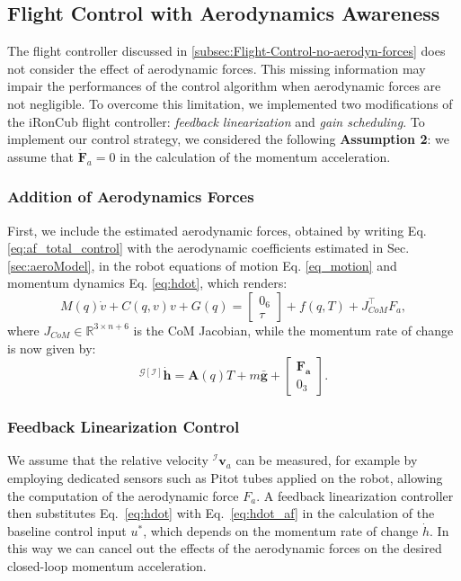 \subsection{Flight Control with Aerodynamics Awareness}

The flight controller discussed in \ref{subsec:Flight-Control-no-aerodyn-forces} does not consider the effect of aerodynamic forces. This missing information may impair the performances of the control algorithm when aerodynamic forces are not negligible. To overcome this limitation, we implemented two modifications of the iRonCub flight controller: \emph{feedback linearization} and \emph{gain scheduling}.
To implement our control strategy, we considered the following \textbf{Assumption 2}: we assume that $\dot{\boldsymbol{F}}_a = 0$ in the calculation of the momentum acceleration.

\subsubsection*{Addition of Aerodynamics Forces}
First, we include the estimated aerodynamic forces, obtained by writing Eq. \eqref{eq:af_total_control} with the aerodynamic coefficients estimated in Sec. \ref{sec:aeroModel}, in the robot equations of motion Eq. \eqref{eq_motion} and momentum dynamics Eq. \eqref{eq:hdot}, which renders:
\begin{equation}
\label{eq_motion_af}
  M(q)\dot{v}+C(q,v)v+G(q)=
  \begin{bmatrix}
    0_6\\
    \tau
  \end{bmatrix}
  +f(q,T)+J_{CoM}^{\top}F_a,
\end{equation}
where $J_{CoM} \in \mathbb{R}^{3 \times n+6}$ is the CoM Jacobian, while the momentum rate of change is now given by:
\begin{equation}
\label{eq:hdot_af}
   {}^{\mathcal{G}[\mathcal{I}]}\dot{\boldsymbol{h}}=\boldsymbol{A}(q)T+m\bar{\boldsymbol{g}}+
   \begin{bmatrix}
   \boldsymbol{F_a}\\
   0_3
   \end{bmatrix}.
\end{equation}

\subsubsection*{Feedback Linearization Control}

We assume that the relative velocity ${}^{\mathcal{I}}\boldsymbol{v}_a$ can be measured, for example by employing dedicated sensors such as Pitot tubes applied on the robot, allowing the computation of the aerodynamic force $F_a$. A feedback linearization controller then substitutes Eq.~\eqref{eq:hdot} with Eq.~\eqref{eq:hdot_af} in the calculation of the baseline control input $u^*$, which depends on the momentum rate of change $\dot{h}$. In this way we can cancel out the effects of the aerodynamic forces on the desired closed-loop momentum acceleration.

